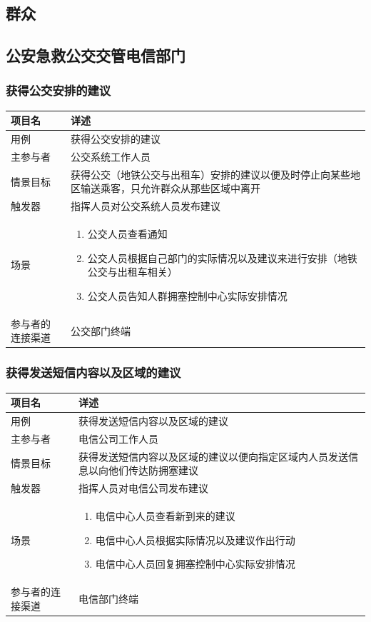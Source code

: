 \documentclass{ctexrep}
\begin{document}
\subsection{群众}
\subsection{公安急救公交交管电信部门}
\subsubsection{获得公交安排的建议}
\begin{longtable}{p{2cm} | p{10cm}}
\hline
项目名 & 详述 \\
\hline
\hline
用例 & 获得公交安排的建议\\
\hline
主参与者 & 公交系统工作人员\\
\hline
情景目标 &  获得公交（地铁公交与出租车）安排的建议以便及时停止向某些地区输送乘客，只允许群众从那些区域中离开\\
\hline
触发器 & 指挥人员对公交系统人员发布建议\\
\hline
场景 & \begin{enumerate}
	\item 公交人员查看通知
	\item 公交人员根据自己部门的实际情况以及建议来进行安排（地铁公交与出租车相关）
	\item 公交人员告知人群拥塞控制中心实际安排情况
\end{enumerate} \\
\hline
参与者的连接渠道 & 公交部门终端\\
\hline
\end{longtable}

\subsubsection{获得发送短信内容以及区域的建议}
\begin{longtable}{p{2cm} | p{10cm}}
\hline
项目名 & 详述 \\
\hline
\hline
用例 & 获得发送短信内容以及区域的建议\\
\hline
主参与者 & 电信公司工作人员\\
\hline
情景目标 & 获得发送短信内容以及区域的建议以便向指定区域内人员发送信息以向他们传达防拥塞建议 \\
\hline
触发器 & 指挥人员对电信公司发布建议\\
\hline
场景 & \begin{enumerate}
	\item 电信中心人员查看新到来的建议
	\item 电信中心人员根据实际情况以及建议作出行动
	\item 电信中心人员回复拥塞控制中心实际安排情况
\end{enumerate} \\
\hline
参与者的连接渠道 & 电信部门终端 \\
\hline
\end{longtable}
\end{document}
